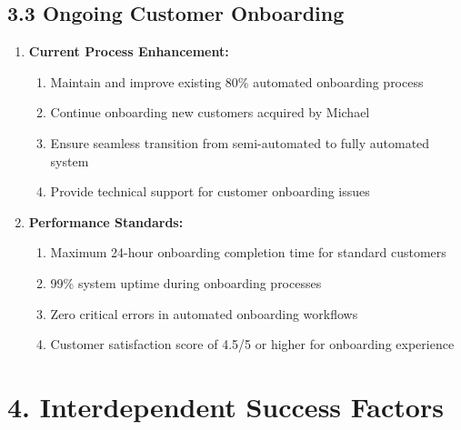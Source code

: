 \subsection*{3.3 Ongoing Customer Onboarding}
\begin{enumerate}[label=\arabic*.]
\item \textbf{Current Process Enhancement:}
    \begin{enumerate}[label=(\alph*)]
    \item Maintain and improve existing 80\% automated onboarding process
    \item Continue onboarding new customers acquired by Michael
    \item Ensure seamless transition from semi-automated to fully automated system
    \item Provide technical support for customer onboarding issues
    \end{enumerate}

\item \textbf{Performance Standards:}
    \begin{enumerate}[label=(\alph*)]
    \item Maximum 24-hour onboarding completion time for standard customers
    \item 99\% system uptime during onboarding processes
    \item Zero critical errors in automated onboarding workflows
    \item Customer satisfaction score of 4.5/5 or higher for onboarding experience
    \end{enumerate}
\end{enumerate}

\section*{4. Interdependent Success Factors}

